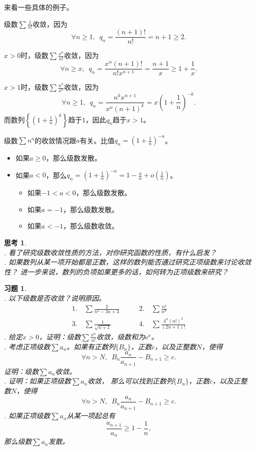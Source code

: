 \documentclass[12pt,UTF8]{ctexbook}
\newcommand{\olim}[1]{\mathit{o}\left(#1\right)}  %
\theoremstyle{definition}
\theoremstyle{plain}
\newtheorem{sk}{思考}[section]
\newtheorem{xt}{习题}[section]
\begin{document}
来看一些具体的例子。

级数$\sum \frac{1}{n!}$收敛，因为
$$\forall n \geqslant 1,  \,\,\,q_n = \frac{(n+1)!}{n!} = n+1 \geqslant 2. $$

$x>0$时，级数$\sum \frac{x^n}{n!}$收敛，因为
$$\forall n \geqslant x,  \,\,\,q_n = \frac{x^n (n+1)!}{n! x^{n+1}} = \frac{n+1}{x} \geqslant 1 + \frac{1}{x}. $$

$x>1$时，级数$\sum \frac{n^k}{x^n}$收敛，因为
$$\forall n \geqslant 1,  \,\,\,q_n = \frac{n^k x^{n+1}}{x^n (n+1)^{k}} = x\left(1 + \frac{1}{n}\right)^{-k}. $$
而数列$\left\{\left(1 + \frac{1}{n}\right)^k\right\}$趋于$1$，因此$q_n$趋于$x>1$。

级数$\sum n^a$的收敛情况跟$a$有关。比值$q_n = \left(1 + \frac{1}{n}\right)^{-a}$。
\begin{itemize}
    \item 如果$a\geqslant 0$，那么级数发散。
    \item 如果$a<0$，那么$q_n = \left(1 + \frac{1}{n}\right)^{-a} = 1 - \frac{a}{n} + \olim{\frac{1}{n}}$。
    \begin{itemize}
        \item 如果$-1 < a < 0$，那么级数发散。
        \item 如果$a = -1$，那么级数发散。
        \item 如果$a < -1$，那么级数收敛。
    \end{itemize}
\end{itemize}

\begin{sk}
    \mbox{} \\
    . 看了研究级数收敛性质的方法，对你研究函数的性质，有什么启发？\\
    . 如果数列从某一项开始都是正数，这样的数列能否通过研究正项级数来讨论收敛性？
    进一步来说，数列的负项如果更多的话，如何转为正项级数来研究？
\end{sk}

\begin{xt}
    \mbox{} \\
    . 以下级数是否收敛？说明原因。
    $$
    \begin{array}{ll}
        1. \quad \sum \frac{2}{n^2 - 3n + 3} \qquad &2. \quad \sum \frac{n!}{n^n} \\
        3. \quad \sum \frac{1}{\sqrt{n + 1}} \qquad &4. \quad \sum \frac{4^n (n!)^2}{(2n + 1)!} 
    \end{array}
    $$
    . 给定$x>0$，证明：级数$\sum \frac{x^n}{n!}$收敛，级数和为$\mathrm{e}^x$。\\
    . 考虑正项级数$\sum a_n$。如果有正数列$\{B_n\}$，正数$c$，以及正整数$N$，使得
    $$ \forall n > N, \,\,\, B_n \frac{a_n}{a_{n+1}} - B_{n+1} \geqslant c. $$
    证明：级数$\sum a_n$收敛。\\
    . 证明：如果正项级数$\sum a_n$收敛，
    那么可以找到正数列$\{B_n\}$，正数$c$，以及正整数$N$，使得
    $$ \forall n > N, \,\,\, B_n \frac{a_n}{a_{n+1}} - B_{n+1} \geqslant c. $$
    . 如果正项级数$\sum a_n$从某一项起总有
    $$ \frac{a_{n+1}}{a_n} \geqslant 1 - \frac{1}{n},$$
    那么级数$\sum a_n$发散。\\

\end{xt}
\end{document}
